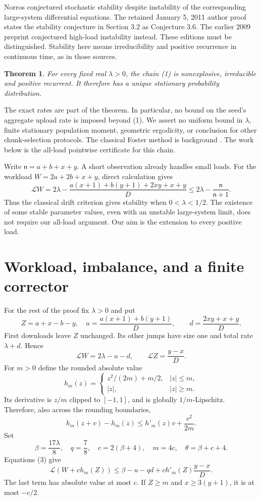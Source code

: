 \documentclass[11pt]{article}
\newtheorem{theorem}{Theorem}
\newcommand{\LL}{\mathcal L}
\begin{document}
Norros \cite[pp.~2782--2783]{OWR} conjectured stochastic stability despite
instability of the corresponding large-system differential equations.
The retained January 5, 2011 author proof states the stability conjecture
in Section 3.2 as Conjecture 3.6. The earlier 2009 preprint
\cite[Conjecture 3.4]{NRE09} conjectured high-load instability instead.
These editions must be distinguished. Stability here means
irreducibility and positive recurrence in continuous time, as in those
sources.

\begin{theorem}\label{thm:main}
For every fixed real $\lambda>0$, the chain \textup{(1)} is nonexplosive,
irreducible and positive recurrent. It therefore has a unique stationary
probability distribution.
\end{theorem}

The exact rates are part of the theorem. In particular, no bound on the
seed's aggregate upload rate is imposed beyond \textup{(1)}. We assert no
uniform bound in $\lambda$, finite stationary population moment,
geometric ergodicity, or conclusion for other chunk-selection protocols.
The classical Foster method is background \cite{MT}. The work below is
the all-load pointwise certificate for this chain.

Write $\mathsf n=a+b+x+y$. A short observation already handles small
loads. For the workload $W=2a+2b+x+y$, direct calculation gives
\[
 \LL W
 =2\lambda-\frac{a(x+1)+b(y+1)+2xy+x+y}{D}
 \le 2\lambda-\frac{\mathsf n}{\mathsf n+1}.
                                                               \tag{2}
\]
Thus the classical drift criterion gives stability when
$0<\lambda<1/2$. The existence of some stable parameter values, even
with an unstable large-system limit, does not require our all-load
argument. Our aim is the extension to every positive load.

\section{Workload, imbalance, and a finite corrector}

For the rest of the proof fix $\lambda>0$ and put
\[
 Z=a+x-b-y,\quad
 u=\frac{a(x+1)+b(y+1)}D,\qquad
 d=\frac{2xy+x+y}D.
\]
First downloads leave $Z$ unchanged. Its other jumps have size one and
total rate $\lambda+d$. Hence
\[
 \LL W=2\lambda-u-d,\qquad \LL Z=\frac{y-x}D.                    \tag{3}
\]
For $m>0$ define the rounded absolute value
\[
 h_m(z)=
 \begin{cases}
 z^2/(2m)+m/2,&|z|\le m,\\
 |z|,&|z|\ge m.
 \end{cases}
\]
Its derivative is $z/m$ clipped to $[-1,1]$, and is globally
$1/m$-Lipschitz. Therefore, also across the rounding boundaries,
\[
 h_m(z+v)-h_m(z)\le h'_m(z)v+\frac{v^2}{2m}.
\]
Set
\[
 \beta=\frac{17\lambda}{8},\quad q=\frac78,\quad
 c=2(\beta+4),\quad m=4c,\quad \theta=\beta+c+4.
\]
Equations (3) give
\[
 \LL(W+ch_m(Z))
 \le \beta-u-qd+c h'_m(Z)\frac{y-x}D.                           \tag{4}
\]
The last term has absolute value at most $c$. If $Z\ge m$ and
$x\ge3(y+1)$, it is at most $-c/2$.
\end{document}
